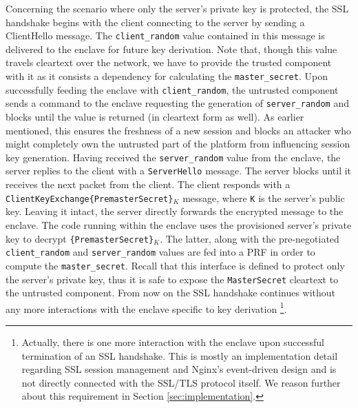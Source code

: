 \documentclass[../main.tex]{subfiles}
\begin{document}
Concerning the scenario where only the server's private key is protected, the
SSL handshake begins with the client connecting to the server by sending a
ClientHello message. The \texttt{client\_random} value contained in this
message is delivered to the enclave for future key derivation. Note that,
though this value travels cleartext over the network, we have to provide the
trusted component with it as it consists a dependency for calculating the
\texttt{master\_secret}. Upon successfully feeding the enclave with
\texttt{client\_random}, the untrusted component sends a command to the enclave
requesting the generation of \texttt{server\_random} and blocks until the value
is returned (in cleartext form as well). As earlier mentioned, this ensures the
freshness of a new session and blocks an attacker who might completely own the
untrusted part of the platform from influencing session key generation. Having
received the \texttt{server\_random} value from the enclave, the server replies
to the client with a \texttt{ServerHello} message. The server blocks until it
receives the next packet from the client. The client responds with a
\texttt{ClientKeyExchange\{PremasterSecret\}$_K$} message, where \texttt{K} is
the server's public key. Leaving it intact, the server directly forwards the
encrypted message to the enclave. The code running within the enclave uses the
provisioned server's private key to decrypt \texttt{\{PremasterSecret\}$_K$}.
The latter, along with the pre-negotiated \texttt{client\_random} and
\texttt{server\_random} values are fed into a PRF in order to compute the
\texttt{master\_secret}. Recall that this interface is defined to protect only
the server's private key, thus it is safe to expose the \texttt{MasterSecret}
cleartext to the untrusted component. From now on the SSL handshake continues
without any more interactions with the enclave specific to key derivation
\footnote{Actually, there is one more interaction with the enclave upon
successful termination of an SSL handshake. This is mostly an implementation
detail regarding SSL session management and Nginx's event-driven design and is
not directly connected with the SSL/TLS protocol itself. We reason further
about this requirement in Section \ref{sec:implementation}.}.
\end{document}
